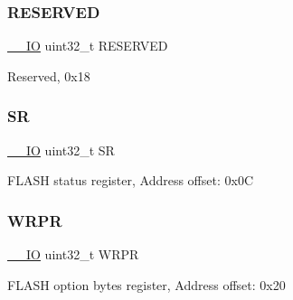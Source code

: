 \subsubsection{\texorpdfstring{R\+E\+S\+E\+R\+V\+ED}{RESERVED}}
{\footnotesize\ttfamily \hyperlink{core__sc300_8h_aec43007d9998a0a0e01faede4133d6be}{\+\_\+\+\_\+\+IO} uint32\+\_\+t R\+E\+S\+E\+R\+V\+ED}

Reserved, 0x18 \mbox{\label{struct_f_l_a_s_h___type_def_af6aca2bbd40c0fb6df7c3aebe224a360}} 
\subsubsection{\texorpdfstring{SR}{SR}}
{\footnotesize\ttfamily \hyperlink{core__sc300_8h_aec43007d9998a0a0e01faede4133d6be}{\+\_\+\+\_\+\+IO} uint32\+\_\+t SR}

F\+L\+A\+SH status register, Address offset\+: 0x0C \mbox{\label{struct_f_l_a_s_h___type_def_a9bc0e514c0860e3c153a6cfa72bdf1c3}} 
\subsubsection{\texorpdfstring{W\+R\+PR}{WRPR}}
{\footnotesize\ttfamily \hyperlink{core__sc300_8h_aec43007d9998a0a0e01faede4133d6be}{\+\_\+\+\_\+\+IO} uint32\+\_\+t W\+R\+PR}

F\+L\+A\+SH option bytes register, Address offset\+: 0x20 

